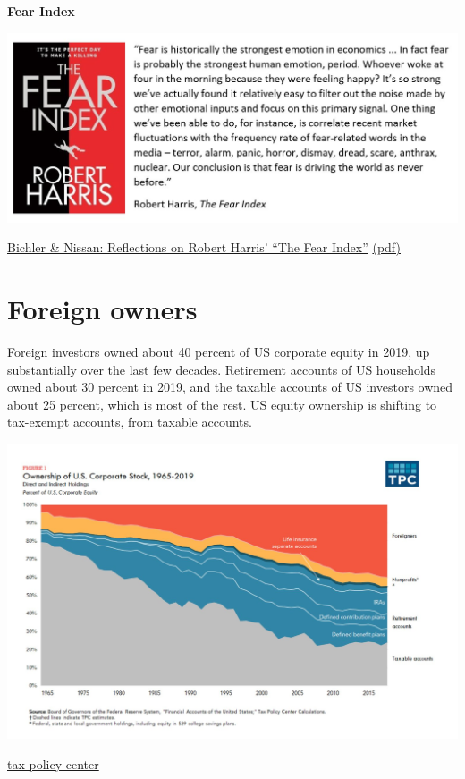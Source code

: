 \documentclass[
]{book}
\begin{document}
\textbf{Fear Index}

\includegraphics{fig/fear_index.jpeg}

\href{http://bnarchives.yorku.ca/401/}{Bichler \& Nissan: Reflections on Robert Harris' ``The Fear Index''}
\href{pdf/Bichler_Nitzan_2014_Fear_Index.pdf}{(pdf)}

\hypertarget{foreign-owners}{%
\section{Foreign owners}\label{foreign-owners}}

Foreign investors owned about 40 percent of US corporate equity in 2019, up substantially over the last few decades. Retirement accounts of US households owned about 30 percent in 2019, and the taxable accounts of US investors owned about 25 percent, which is most of the rest.
US equity ownership is shifting to tax-exempt accounts, from taxable accounts.

\includegraphics{fig/Ownership_1965-2019_US_Corp_Stock.jpeg}

\href{https://www.taxpolicycenter.org/taxvox/who-owns-us-stock-foreigners-and-rich-americans}{tax policy center}
\end{document}
